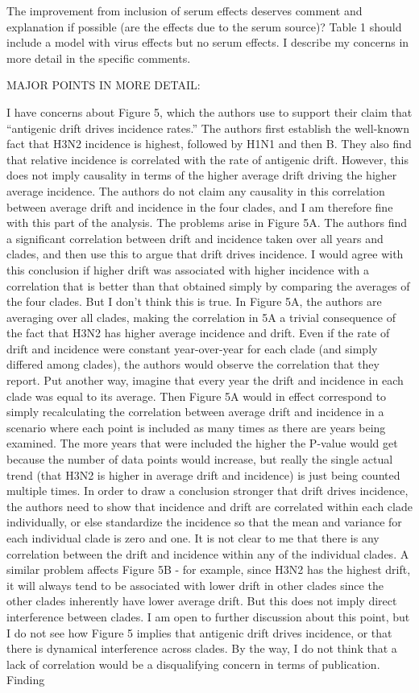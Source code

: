 \documentclass[11pt,oneside,letterpaper]{article}
\begin{document}
The improvement from inclusion of serum effects deserves comment and explanation if possible (are the effects due to the serum source)? Table 1 should include a model with virus effects but no serum effects. I describe my concerns in more detail in the specific comments.

MAJOR POINTS IN MORE DETAIL:

I have concerns about Figure 5, which the authors use to support their claim that ``antigenic drift drives incidence rates.'' The authors first establish the well-known fact that H3N2 incidence is highest, followed by H1N1 and then B. They also find that relative incidence is correlated with the rate of antigenic drift. However, this does not imply causality in terms of the higher average drift driving the higher average incidence. The authors do not claim any causality in this correlation between average drift and incidence in the four clades, and I am therefore fine with this part of the analysis. The problems arise in Figure 5A. The authors find a significant correlation between drift and incidence taken over all years and clades, and then use this to argue that drift drives incidence. I would agree with this conclusion if higher drift was associated with higher incidence with a correlation that is better than that obtained simply by comparing the averages of the four clades. But I don't think this is true. In Figure 5A, the authors are averaging over all clades, making the correlation in 5A a trivial consequence of the fact that H3N2 has higher average incidence and drift. Even if the rate of drift and incidence were constant year-over-year for each clade (and simply differed among clades), the authors would observe the correlation that they report. Put another way, imagine that every year the drift and incidence in each clade was equal to its average. Then Figure 5A would in effect correspond to simply recalculating the correlation between average drift and incidence in a scenario where each point is included as many times as there are years being examined. The more years that were included the higher the P-value would get because the number of data points would increase, but really the single actual trend (that H3N2 is higher in average drift and incidence) is just being counted multiple times. In order to draw a conclusion stronger that drift drives incidence, the authors need to show that incidence and drift are correlated within each clade individually, or else standardize the incidence so that the mean and variance for each individual clade is zero and one. It is not clear to me that there is any correlation between the drift and incidence within any of the individual clades. A similar problem affects Figure 5B - for example, since H3N2 has the highest drift, it will always tend to be associated with lower drift in other clades since the other clades inherently have lower average drift. But this does not imply direct interference between clades. I am open to further discussion about this point, but I do not see how Figure 5 implies that antigenic drift drives incidence, or that there is dynamical interference across clades. By the way, I do not think that a lack of correlation would be a disqualifying concern in terms of publication. Finding 
\end{document}
